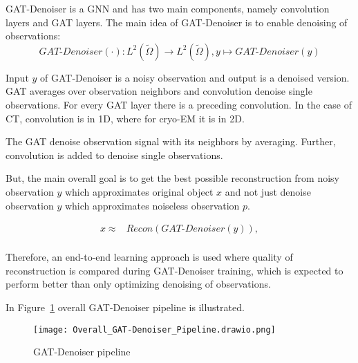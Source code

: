 GAT-Denoiser is a GNN and has two main components, namely convolution layers and GAT layers.
The main idea of GAT-Denoiser is to enable denoising of observations:
\begin{equation}
  \textit{GAT-Denoiser} (\cdot) : L^2(\tilde{\Omega}) \to  L^2(\tilde{\Omega}) , y \mapsto \textit{GAT-Denoiser} (y) 
\end{equation}


Input $y$ of GAT-Denoiser is a noisy observation and output is a denoised version.
GAT averages over observation neighbors and convolution denoise single observations. 
For every GAT layer there is a preceding convolution. 
In the case of CT, convolution is in 1D, where for cryo-EM it is in 2D.

\begin{tcolorbox}[colback=red!5!white,colframe=red!75!black]
  The GAT denoise observation signal with its neighbors by averaging. 
  Further, convolution is added to denoise single observations.
\end{tcolorbox}


But, the main overall goal is to get the best possible reconstruction 
from noisy observation $y$ which approximates original object $x$ and 
not just denoise observation $y$ which approximates noiseless observation $p$.


\begin{equation}
  \begin{aligned}
    x \approx   &\textit{Recon} \left( \textit{GAT-Denoiser} \left( y \right) \right), \\
  \end{aligned}
\end{equation}

Therefore, an end-to-end learning approach is used where quality of reconstruction is 
compared during GAT-Denoiser training, which is expected to perform better than 
only optimizing denoising of observations.

In Figure~\ref{fig:overall-concept} overall GAT-Denoiser pipeline is illustrated.

\begin{figure}[H]
  \centering
  \texttt{[image: Overall\_GAT-Denoiser\_Pipeline.drawio.png]}
  \caption{GAT-Denoiser pipeline}
  \label{fig:overall-concept}
\end{figure}


